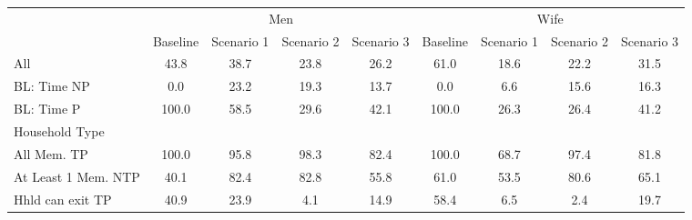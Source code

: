 \begin{tabular}{l*{8}{c}}
\hline\hline
          & \multicolumn{4}{c}{Men} & \multicolumn{4}{c}{Wife} \\ 
\cline{2-5} \cline{6-9}
            &    Baseline&  Scenario 1&  Scenario 2&  Scenario 3&    Baseline&  Scenario 1&  Scenario 2&  Scenario 3\\
\hline
All         &        43.8&        38.7&        23.8&        26.2&        61.0&        18.6&        22.2&        31.5\\
BL: Time NP &         0.0&        23.2&        19.3&        13.7&         0.0&         6.6&        15.6&        16.3\\
BL: Time P  &       100.0&        58.5&        29.6&        42.1&       100.0&        26.3&        26.4&        41.2\\
\midrule

Household Type      & \multicolumn{8}{c}{} \\ 
All Mem. TP         &       100.0&        95.8&        98.3&        82.4&       100.0&        68.7&        97.4&        81.8\\
At Least 1 Mem. NTP &        40.1&        82.4&        82.8&        55.8&        61.0&        53.5&        80.6&        65.1\\
Hhld can exit TP    &        40.9&        23.9&         4.1&        14.9&        58.4&         6.5&         2.4&        19.7\\
\hline\hline
\end{tabular}
